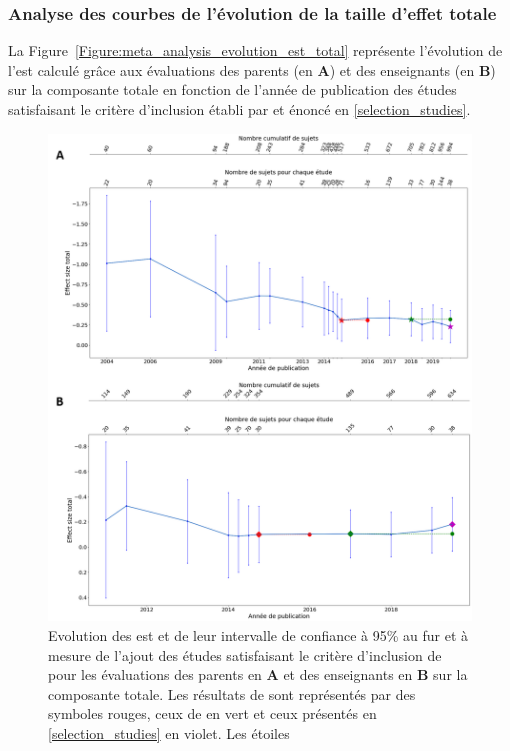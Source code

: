 \subsubsection{Analyse des courbes de l'évolution de la taille d'effet totale}

La Figure~\ref{Figure:meta_analysis_evolution_est_total} représente l'évolution de l'\gls{est} calculé grâce aux évaluations des parents (en \textbf{A}) et des 
enseignants (en \textbf{B}) sur la composante totale en fonction de l'année de publication des études satisfaisant le critère d'inclusion établi par \citep{Cortese2016} et énoncé en 
\ref{selection_studies}.

\begin{figure}[h!]
  \centering
	\includegraphics[width=1\linewidth]{figures/chapter-2/meta-analysis-evolution-summary-effect-total} 
  \caption{Evolution des \gls{est} et de leur intervalle de confiance à 95\% au fur et à mesure de l'ajout des études satisfaisant le critère d'inclusion de \citet{Cortese2016} pour les évaluations des 
	parents en \textbf{A} et des enseignants en \textbf{B} sur la composante totale.
  Les résultats de \citep{Cortese2016} sont représentés par des symboles rouges, ceux de \citet{Bussalb2016clinical} en vert et ceux présentés en \ref{selection_studies} en violet. Les étoiles 
}
\end{figure}
